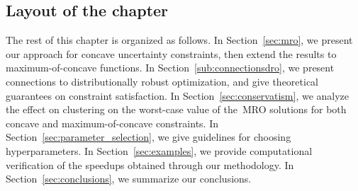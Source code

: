 \subsection{Layout of the chapter}%
The rest of this chapter is organized as follows.
In Section~\ref{sec:mro}, we present our approach for concave uncertainty constraints, then extend the results to maximum-of-concave functions. 
In Section~\ref{sub:connectionsdro}, we present connections to distributionally robust optimization, and give theoretical guarantees on constraint satisfaction.
In Section~\ref{sec:conservatism}, we analyze the effect on clustering on the worst-case value of the~\gls{MRO} solutions for both concave and maximum-of-concave constraints.
In Section~\ref{sec:parameter_selection}, we give guidelines for choosing hyperparameters.
In Section~\ref{sec:examples}, we provide computational verification of the speedups obtained through our methodology.
In Section~\ref{sec:conclusions}, we summarize our conclusions.

